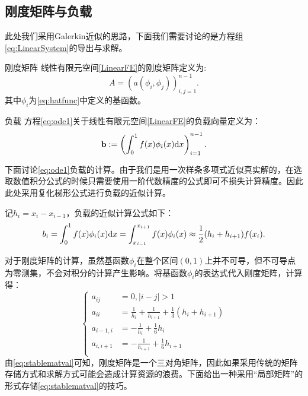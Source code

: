 \subsection{刚度矩阵与负载}
此处我们采用Galerkin近似的思路，下面我们需要讨论的是方程组\eqref{eq:LinearSystem}的导出与求解。

\begin{definition}{刚度矩阵}
  线性有限元空间\ref{LinearFE}的刚度矩阵定义为:
  \begin{equation}
    \label{eq:stablemat}
    A=(a(\phi_{i},\phi_{j}))_{i,j=1}^{n-1}.
  \end{equation}
  其中$\phi_{i}$为\eqref{eq:hatfunc}中定义的基函数。
\end{definition}

\begin{definition}{负载}
  方程\eqref{eq:ode1}关于线性有限元空间\ref{LinearFE}的负载向量定义为：
  \begin{equation}
    \label{eq:overload}
    \mathbf{b}:=\left(\int_{0}^{1}f(x)\phi_{i}(x)\mathrm{d} x\right)_{i=1}^{n-1}.
  \end{equation}
\end{definition}

下面讨论\eqref{eq:ode1}负载的计算。由于我们是用一次样条多项式近似真实解的，在选取数值积分公式的时候只需要使用一阶代数精度的公式即可不损失计算精度。因此此处采用复化梯形公式进行负载的近似计算。

记$h_{i}=x_{i}-x_{i-1}$，负载的近似计算公式如下：
\begin{equation}
  b_{i}=\int_{0}^{1}f(x)\phi_{i}(x)\mathrm{d} x=\int_{x_{i-1}}^{x_{i+1}}f(x)\phi_{i}(x)\approx \frac{1}{2}(h_{i}+h_{i+1})f(x_{i}).
\end{equation}

对于刚度矩阵的计算，虽然基函数$\phi_{i}$在整个区间$(0,1)$上并不可导，但不可导点为零测集，不会对积分的计算产生影响。将基函数$\phi_{i}$的表达式代入刚度矩阵，计算得：
\begin{equation}
  \label{eq:stablematval}
  \left\{
    \begin{aligned}
      a_{ij}&=0,|i-j|>1\\
      a_{ii}&=\frac{1}{h_{i}}+\frac{1}{h_{i+1}}+\frac{1}{3}(h_{i}+h_{i+1})\\
      a_{i-1,i}&=-\frac{1}{h_{i}}+\frac{1}{6}h_{i}\\
      a_{i,i+1}&=-\frac{1}{h_{i+1}}+\frac{1}{6}h_{i+1}\\
    \end{aligned}
  \right.
\end{equation}
由\eqref{eq:stablematval}可知，刚度矩阵是一个三对角矩阵，因此如果采用传统的矩阵存储方式和求解方式可能会造成计算资源的浪费。下面给出一种采用“局部矩阵”的形式存储\eqref{eq:stablematval}的技巧。

